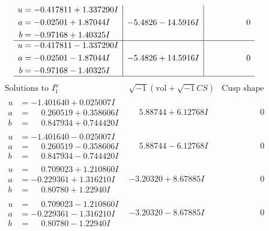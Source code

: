 \documentclass[1p]{elsarticle_modified}
\theoremstyle{definition}
\newcommand{\I}{\sqrt{-1}}
\begin{document}
$$\begin{array}{c|c|c}
\begin{aligned}
u &= -0.417811 + 1.337290 I \\
a &= -0.02501 + 1.87044 I \\
b &= -0.97168 + 1.40325 I\end{aligned}
 & -5.4826 - 14.5916 I & \phantom{-0.000000 } 0 \\ \hline\begin{aligned}
u &= -0.417811 - 1.337290 I \\
a &= -0.02501 - 1.87044 I \\
b &= -0.97168 - 1.40325 I\end{aligned}
 & -5.4826 + 14.5916 I & \phantom{-0.000000 } 0\\
 \hline 
 \end{array}$$\newpage$$\begin{array}{c|c|c}  
\text{Solutions to }I^u_{1}& \I (\text{vol} + \sqrt{-1}CS) & \text{Cusp shape}\\
 \hline 
\begin{aligned}
u &= -1.401640 + 0.025007 I \\
a &= \phantom{-}0.260519 + 0.358606 I \\
b &= \phantom{-}0.847934 + 0.744420 I\end{aligned}
 & \phantom{-}5.88744 + 6.12768 I & \phantom{-0.000000 } 0 \\ \hline\begin{aligned}
u &= -1.401640 - 0.025007 I \\
a &= \phantom{-}0.260519 - 0.358606 I \\
b &= \phantom{-}0.847934 - 0.744420 I\end{aligned}
 & \phantom{-}5.88744 - 6.12768 I & \phantom{-0.000000 } 0 \\ \hline\begin{aligned}
u &= \phantom{-}0.709023 + 1.210860 I \\
a &= -0.229361 + 1.316210 I \\
b &= \phantom{-}0.80780 + 1.22940 I\end{aligned}
 & -3.20320 + 8.67885 I & \phantom{-0.000000 } 0 \\ \hline\begin{aligned}
u &= \phantom{-}0.709023 - 1.210860 I \\
a &= -0.229361 - 1.316210 I \\
b &= \phantom{-}0.80780 - 1.22940 I\end{aligned}
 & -3.20320 - 8.67885 I & \phantom{-0.000000 } 0 \\ \hline\begin{aligned}

\end{aligned}
\end{array}$$
\end{document}
